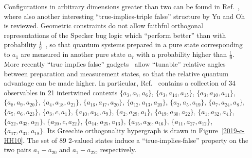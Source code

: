 Configurations in arbitrary dimensions greater than two can be found in Ref.~\cite{2018-minimalYIYS}, where also another
interesting ``true-implies-triple false'' structure by Yu and Oh~\cite[Fig.~2]{Yu-2012} is reviewed.
Geometric constraints do not allow faithful orthogonal representations of the Specker bug logic which
``perform better'' than with probability  $\frac{1}{9}$~\cite{cabello-1994,Cabello-1996-diss,svozil-tkadlec}, so that quantum systems prepared in a pure state corresponding to $a_1$
are measured in another pure state $a_7$ with a probability higher than $\frac{1}{9}$.
More recently ``true implies false'' gadgets~\cite{2015-AnalyticKS,svozil-2018-whycontexts,Ramanathan-18}
allow ``tunable'' relative angles between preparation and measurement states,
so that the relative quantum advantage
can be made higher.
In particular, Ref.~\cite{Ramanathan-18}
contains a collection of 34 observables
in 21 intertwined contexts
 {\color{orange} $\{ a_{ 3}, a_{ 7}, a_{ 6}  \}$},
 {\color{blue}  $\{ a_{ 3}, a_{14}, a_{15} \}$},
 {\color{green}  $\{ a_{ 3}, a_{10}, a_{11} \}$},
 {\color{magenta}  $\{ a_{ 8}, a_{ 9}, a_{20} \}$},
 {\color{black}  $\{ a_{ 4}, a_{18}, a_{21} \}$},
 {\color{brown}  $\{ a_{16}, a_{17}, a_{20} \}$},
 {\color{gray}  $\{ a_{12}, a_{13}, a_{20} \}$},
 {\color{violet}  $\{ a_{ 2}, a_{ 5}, a_{19} \}$},
 {\color{TealBlue}  $\{ a_{ 7}, a_{24}, a_{ 8} \}$},
 {\color{Apricot}  $\{ a_{ 5}, a_{ 6}, a_{23} \}$},
 {\color{MidnightBlue}  $\{ a_{ 3}, c, a_{ 1}      \}$},
 {\color{Mulberry}  $\{ a_{10}, a_{34}, a_{ 9} \}$},
 {\color{BrickRed}  $\{ a_{ 2}, a_{29}, a_{ 1} \}$},
 {\color{Emerald}  $\{ a_{19}, a_{30}, a_{22} \}$},
 {\color{YellowGreen}  $\{ a_{ 1}, a_{32}, a_{ 4} \}$},
 {\color{Tan}  $\{ a_{22}, a_{33}, a_{21} \}$},
 {\color{RawSienna}  $\{ a_{20}, c, a_{22}      \}$},
 {\color{SpringGreen}  $\{ a_{14}, a_{25}, a_{13} \}$},
 {\color{Salmon}  $\{ a_{15}, a_{26}, a_{16} \}$},
 {\color{Fuchsia}  $\{ a_{11}, a_{27}, a_{12} \}$},
 {\color{CornflowerBlue}  $\{ a_{17}, a_{31}, a_{18} \}$}.
Its Greechie orthogonality hypergraph is drawn in Figure~\ref{2019-c-HH10}.
The set of 89 2-valued states induce a
``true-implies-false'' property on the two pairs $a_1-a_{20}$ and $a_1-a_{22}$, respectively.
